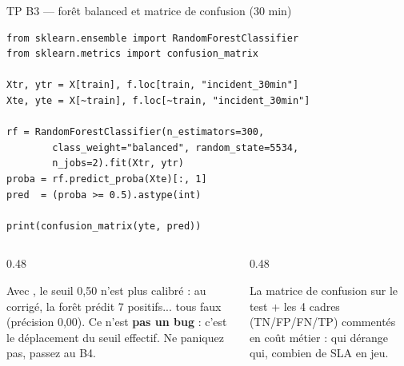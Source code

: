 \begin{frame}[fragile]{TP B3 --- forêt balanced et matrice de confusion (30 min)}
\begin{codebox}
\begin{lstlisting}
from sklearn.ensemble import RandomForestClassifier
from sklearn.metrics import confusion_matrix

Xtr, ytr = X[train], f.loc[train, "incident_30min"]
Xte, yte = X[~train], f.loc[~train, "incident_30min"]

rf = RandomForestClassifier(n_estimators=300,
        class_weight="balanced", random_state=5534,
        n_jobs=2).fit(Xtr, ytr)
proba = rf.predict_proba(Xte)[:, 1]
pred  = (proba >= 0.5).astype(int)

print(confusion_matrix(yte, pred))
\end{lstlisting}
\end{codebox}
\begin{columns}[t]
\begin{column}{0.48\textwidth}
\begin{wbox}
Avec , le seuil 0,50 n'est plus
calibré : au corrigé, la forêt prédit 7 positifs... tous faux
(précision 0,00). Ce n'est \textbf{pas un bug} : c'est le déplacement
du seuil effectif. Ne paniquez pas, passez au B4.
\end{wbox}
\end{column}
\begin{column}{0.48\textwidth}
\begin{ebox}[Livrable B3]
La matrice de confusion sur le test + les 4 cadres
(TN/FP/FN/TP) commentés en coût métier : qui dérange qui,
combien de SLA en jeu.
\end{ebox}
\end{column}
\end{columns}
\end{frame}

